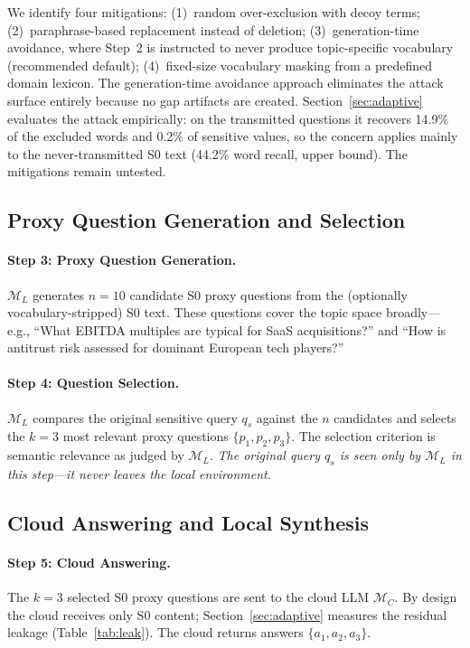 \documentclass[sigconf,balance=false]{acmart}
\begin{document}
We identify four mitigations: (1)~random over-exclusion with decoy terms; (2)~paraphrase-based replacement instead of deletion; (3)~generation-time avoidance, where Step~2 is instructed to never produce topic-specific vocabulary (recommended default); (4)~fixed-size vocabulary masking from a predefined domain lexicon. The generation-time avoidance approach eliminates the attack surface entirely because no gap artifacts are created. Section~\ref{sec:adaptive} evaluates the attack empirically: on the transmitted questions it recovers 14.9\% of the excluded words and 0.2\% of sensitive values, so the concern applies mainly to the never-transmitted S0 text (44.2\% word recall, upper bound). The mitigations remain untested.

\subsection{Proxy Question Generation and Selection}
\label{sec:proxy-questions}

\paragraph{Step 3: Proxy Question Generation.} $\mathcal{M}_L$ generates $n = 10$ candidate S0 proxy questions from the (optionally vocabulary-stripped) S0 text. These questions cover the topic space broadly---e.g., ``What EBITDA multiples are typical for SaaS acquisitions?'' and ``How is antitrust risk assessed for dominant European tech players?''

\paragraph{Step 4: Question Selection.} $\mathcal{M}_L$ compares the original sensitive query $q_s$ against the $n$ candidates and selects the $k = 3$ most relevant proxy questions $\{p_1, p_2, p_3\}$. The selection criterion is semantic relevance as judged by $\mathcal{M}_L$. \emph{The original query $q_s$ is seen only by $\mathcal{M}_L$ in this step---it never leaves the local environment.}

\subsection{Cloud Answering and Local Synthesis}
\label{sec:synthesis}

\paragraph{Step 5: Cloud Answering.} The $k = 3$ selected S0 proxy questions are sent to the cloud LLM $\mathcal{M}_C$. By design the cloud receives only S0 content; Section~\ref{sec:adaptive} measures the residual leakage (Table~\ref{tab:leak}). The cloud returns answers $\{a_1, a_2, a_3\}$.
\end{document}
